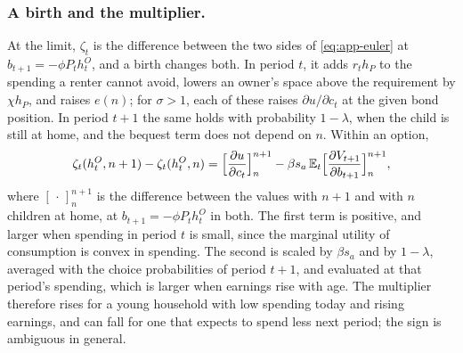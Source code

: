 \subsubsection*{A birth and the multiplier.}
At the limit, $\zeta_t$ is the difference between the two sides of
\eqref{eq:app-euler} at $b_{t+1}=-\phi P_th^O_t$, and a birth changes both.
In period $t$, it adds $r_th_P$ to the spending a renter cannot avoid,
lowers an owner's space above the requirement by $\chi h_P$, and raises
$e(n)$; for $\sigma>1$, each of these raises $\partial u/\partial c_t$ at the
given bond position. In period $t+1$ the same holds with probability
$1-\lambda$, when the child is still at home, and the bequest term does not
depend on $n$. Within an option,
\begin{equation}
 \zeta_t(h^O_t,n+1)-\zeta_t(h^O_t,n)
 =\Bigl[\frac{\partial u}{\partial c_t}\Bigr]_{n}^{n+1}
 -\beta s_a\,\mathbb E_t\Bigl[\frac{\partial V_{t+1}}{\partial b_{t+1}}\Bigr]_{n}^{n+1},
 \label{eq:app-birth}
\end{equation}
where $[\,\cdot\,]_n^{n+1}$ is the difference between the values with $n+1$
and with $n$ children at home, at $b_{t+1}=-\phi P_th^O_t$ in both. The
first term is positive, and larger when spending in period $t$ is small,
since the marginal utility of consumption is convex in spending. The second
is scaled by $\beta s_a$ and by $1-\lambda$, averaged with the choice
probabilities of period $t+1$, and evaluated at that period's spending,
which is larger when earnings rise with age. The multiplier therefore rises
for a young household with low spending today and rising earnings, and can
fall for one that expects to spend less next period; the sign is ambiguous
in general.

